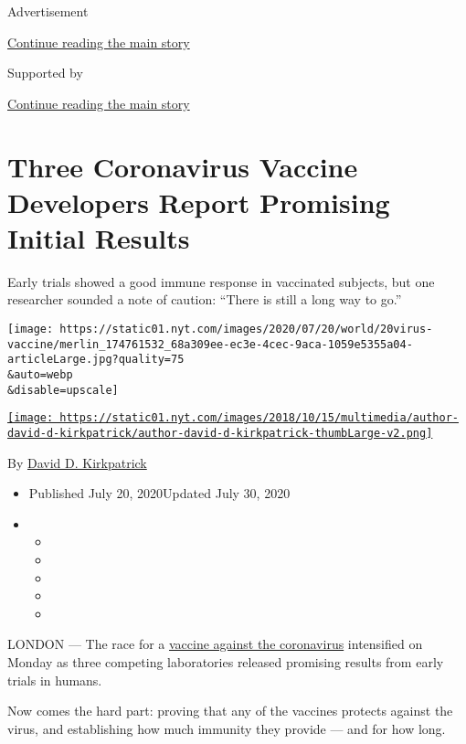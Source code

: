 Advertisement

\protect\hyperlink{after-top}{Continue reading the main story}

Supported by

\protect\hyperlink{after-sponsor}{Continue reading the main story}

\hypertarget{three-coronavirus-vaccine-developers-report-promising-initial-results}{%
\section{Three Coronavirus Vaccine Developers Report Promising Initial
Results}\label{three-coronavirus-vaccine-developers-report-promising-initial-results}}

Early trials showed a good immune response in vaccinated subjects, but
one researcher sounded a note of caution: ``There is still a long way to
go.''

\texttt{[image: https://static01.nyt.com/images/2020/07/20/world/20virus-vaccine/merlin\_174761532\_68a309ee-ec3e-4cec-9aca-1059e5355a04-articleLarge.jpg?quality=75\\\&auto=webp\\\&disable=upscale]}

\href{https://www.nytimes.com/by/david-d-kirkpatrick}{\texttt{[image: https://static01.nyt.com/images/2018/10/15/multimedia/author-david-d-kirkpatrick/author-david-d-kirkpatrick-thumbLarge-v2.png]}}

By \href{https://www.nytimes.com/by/david-d-kirkpatrick}{David D.
Kirkpatrick}

\begin{itemize}
\item
  Published July 20, 2020Updated July 30, 2020
\item
  \begin{itemize}
  \item
  \item
  \item
  \item
  \item
  \end{itemize}
\end{itemize}

LONDON --- The race for a
\href{https://www.nytimes.com/2020/07/30/health/covid-19-vaccine-monkeys.html}{vaccine
against the coronavirus} intensified on Monday as three competing
laboratories released promising results from early trials in humans.

Now comes the hard part: proving that any of the vaccines protects
against the virus, and establishing how much immunity they provide ---
and for how long.

